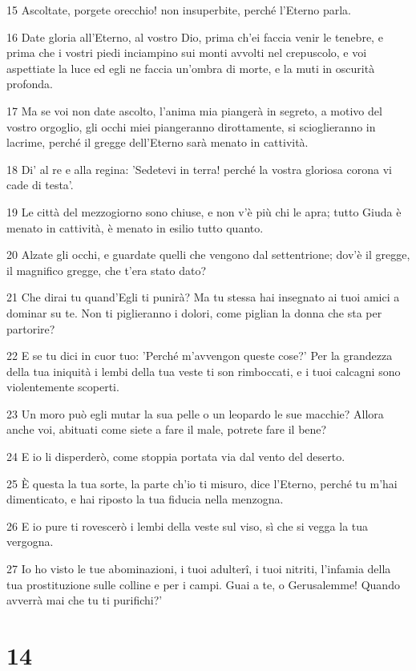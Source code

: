 \par 15 Ascoltate, porgete orecchio! non insuperbite, perché l'Eterno parla.
\par 16 Date gloria all'Eterno, al vostro Dio, prima ch'ei faccia venir le tenebre, e prima che i vostri piedi inciampino sui monti avvolti nel crepuscolo, e voi aspettiate la luce ed egli ne faccia un'ombra di morte, e la muti in oscurità profonda.
\par 17 Ma se voi non date ascolto, l'anima mia piangerà in segreto, a motivo del vostro orgoglio, gli occhi miei piangeranno dirottamente, si scioglieranno in lacrime, perché il gregge dell'Eterno sarà menato in cattività.
\par 18 Di' al re e alla regina: 'Sedetevi in terra! perché la vostra gloriosa corona vi cade di testa'.
\par 19 Le città del mezzogiorno sono chiuse, e non v'è più chi le apra; tutto Giuda è menato in cattività, è menato in esilio tutto quanto.
\par 20 Alzate gli occhi, e guardate quelli che vengono dal settentrione; dov'è il gregge, il magnifico gregge, che t'era stato dato?
\par 21 Che dirai tu quand'Egli ti punirà? Ma tu stessa hai insegnato ai tuoi amici a dominar su te. Non ti piglieranno i dolori, come piglian la donna che sta per partorire?
\par 22 E se tu dici in cuor tuo: 'Perché m'avvengon queste cose?' Per la grandezza della tua iniquità i lembi della tua veste ti son rimboccati, e i tuoi calcagni sono violentemente scoperti.
\par 23 Un moro può egli mutar la sua pelle o un leopardo le sue macchie? Allora anche voi, abituati come siete a fare il male, potrete fare il bene?
\par 24 E io li disperderò, come stoppia portata via dal vento del deserto.
\par 25 È questa la tua sorte, la parte ch'io ti misuro, dice l'Eterno, perché tu m'hai dimenticato, e hai riposto la tua fiducia nella menzogna.
\par 26 E io pure ti rovescerò i lembi della veste sul viso, sì che si vegga la tua vergogna.
\par 27 Io ho visto le tue abominazioni, i tuoi adulterî, i tuoi nitriti, l'infamia della tua prostituzione sulle colline e per i campi. Guai a te, o Gerusalemme! Quando avverrà mai che tu ti purifichi?'

\chapter{14}

